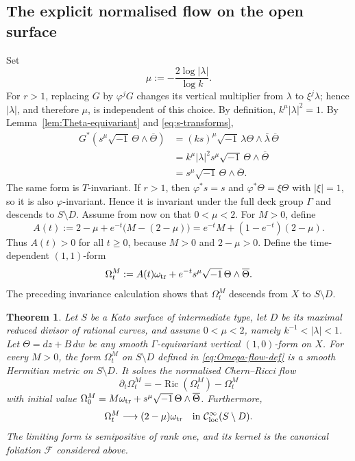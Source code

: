 \documentclass[12pt]{amsart}
\numberwithin{equation}{section}
\newtheorem{theorem}{Theorem}
\theoremstyle{remark}
\theoremstyle{definition}
\begin{document}
\subsection{The explicit normalised flow on the open surface}

Set
\begin{equation}\label{eq:mu-def}
 \mu:=-\frac{2\log|\lambda|}{\log k}.
\end{equation}
For $r>1$, replacing $G$ by $\varphi^jG$ changes its vertical multiplier from $\lambda$ to $\xi^j\lambda$; hence $|\lambda|$, and therefore $\mu$, is independent of this choice. By definition, $k^\mu|\lambda|^2=1$.
By Lemma~\ref{lem:Theta-equivariant} and \eqref{eq:s-transforms},
\begin{align*}
 G^*\left(s^\mu\sqrt{-1}\,\Theta\wedge\overline\Theta\right)
 &=
 (ks)^\mu\sqrt{-1}\,\lambda\Theta\wedge
 \bar\lambda\,\overline\Theta \\
 &=
 k^\mu|\lambda|^2s^\mu
 \sqrt{-1}\,\Theta\wedge\overline\Theta \\
 &=
 s^\mu\sqrt{-1}\,\Theta\wedge\overline\Theta.
\end{align*}
The same form is $T$-invariant. If $r>1$, then $\varphi^*s=s$ and $\varphi^*\Theta=\xi\Theta$ with $|\xi|=1$, so it is also $\varphi$-invariant. Hence it is invariant under the full deck group $\Gamma$ and descends to $S\setminus D$.
Assume from now on that $0<\mu<2$. For $M>0$, define
$$
A(t):=2-\mu+e^{-t}\bigl(M-(2-\mu)\bigr)=e^{-t}M+(1-e^{-t})(2-\mu).
$$
Thus $A(t)>0$ for all $t\geq0$, because $M>0$ and $2-\mu>0$.
Define the time-dependent $(1,1)$-form
\begin{equation}\label{eq:Omega-flow-def}
 \Omega_t^M
 :=
 A(t)\omega_{\rm tr}
 +
 e^{-t}s^\mu\sqrt{-1}\,\Theta\wedge\overline\Theta.
\end{equation}
The preceding invariance calculation shows that $\Omega_t^M$ descends from
$X$ to $S\setminus D$.


\begin{theorem}\label{thm:main-open-flow}
Let $S$ be a Kato surface of intermediate type, let $D$ be its maximal reduced divisor of rational curves, and assume $0<\mu<2$,  namely $k^{-1}<|\lambda|<1$.
Let $\Theta=dz+B\,dw$ be any
smooth $\Gamma$-equivariant vertical $(1,0)$-form on $X$. 
For every $M>0$, the form $\Omega_t^M$ on $S\setminus D$ defined in \eqref{eq:Omega-flow-def} is a smooth Hermitian metric on $S\setminus D$. It solves the normalised Chern--Ricci flow
\begin{equation*}
 \partial_t\Omega_t^M=-\operatorname{Ric}(\Omega_t^M)-\Omega_t^M
\end{equation*}
with initial value $\Omega_0^M = M\omega_{\rm tr} + s^\mu\sqrt{-1}\,\Theta\wedge\overline\Theta$.
Furthermore,
\begin{equation*}
 \Omega_t^M
 \longrightarrow
 (2-\mu)\omega_{\rm tr}
 \quad
 \text{in } \mathcal C^\infty_{\rm loc}(S\setminus D).
\end{equation*}
The limiting form is semipositive of rank one, and its kernel is the canonical foliation $\mathcal F$ considered above.
\end{theorem}
\end{document}
